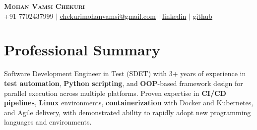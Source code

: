\documentclass[letterpaper,11pt]{article}
\begin{document}
\begin{center}
    \textbf{\Huge \scshape Mohan Vamsi Chekuri} \\ \vspace{1pt}
    \small +91 7702437999 $|$ \href{mailto:chekurimohanvamsi@gmail.com}{\underline{chekurimohanvamsi@gmail.com}} $|$
    \href{https://www.linkedin.com/in/mvamsi73}{\underline{linkedin}} $|$
    \href{https://github.com}{\underline{github}}
\end{center}

\section{Professional Summary}
Software Development Engineer in Test (SDET) with 3+ years of experience in \textbf{test automation}, \textbf{Python scripting}, and \textbf{OOP}-based framework design for parallel execution across multiple platforms. Proven expertise in \textbf{CI/CD pipelines}, \textbf{Linux} environments, \textbf{containerization} with Docker and Kubernetes, and Agile delivery, with demonstrated ability to rapidly adopt new programming languages and environments.
\end{document}

